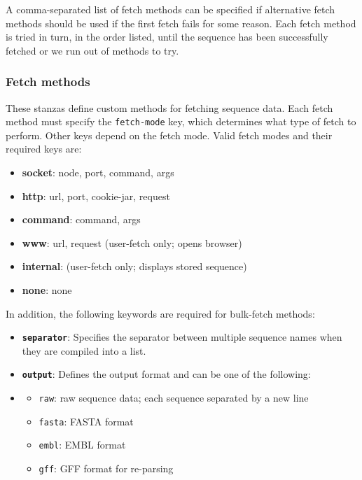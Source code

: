 \documentclass[letterpaper]{article}
\newcommand\textstyleSourceText[1]{\texttt{#1}}
\newcommand\liststyleLii{%
\renewcommand\labelitemi{{\textbullet}}
\renewcommand\labelitemii{{\textbullet}}
\renewcommand\labelitemiii{{\textbullet}}
\renewcommand\labelitemiv{{\textbullet}}
}
\newcommand\liststyleLiii{%
\renewcommand\labelitemi{{\textbullet}}
\renewcommand\labelitemii{{\textbullet}}
\renewcommand\labelitemiii{{\textbullet}}
\renewcommand\labelitemiv{{\textbullet}}
}
\begin{document}
{A comma-separated list of fetch methods can be specified if alternative
fetch methods should be used if the first fetch fails for some reason.
Each fetch method is tried in turn, in the order listed, until the
sequence has been successfully fetched or we run out of methods to try.}

{\color[rgb]{0.30980393,0.5058824,0.7411765}\subsubsection[Fetch methods ]{Fetch methods }}
{These stanzas define custom methods for fetching sequence data. Each
fetch method must specify the \textstyleSourceText{fetch-mode} key,
which determines what type of fetch to perform. Other keys depend on
the fetch mode. Valid fetch modes and their required keys are: }

\liststyleLii
\begin{itemize}
\item {\ttfamily
\textbf{socket}: node, port, command, args }
\item {\ttfamily
\textbf{http}: url, port, cookie-jar, request }
\item {\ttfamily
\textbf{command}: command, args }
\item {\ttfamily
\textbf{www}: url, request (user-fetch only; opens browser) }
\item {\ttfamily
\textbf{internal}: (user-fetch only; displays stored sequence) }
\item {\ttfamily
\textbf{none}: none }
\end{itemize}

\bigskip

{
In addition, the following keywords are required for bulk-fetch methods:
}

\liststyleLii
\begin{itemize}
\item {
\texttt{\textbf{separator}}: Specifies the separator between multiple
sequence names when they are compiled into a list. }
\item {
\texttt{\textbf{output}}: Defines the output format and can be one of
the following: }
\end{itemize}
\liststyleLiii
\begin{itemize}
\item \begin{itemize}
\item {
\texttt{raw}: raw sequence data; each sequence separated by a new line}
\item {
\texttt{fasta}: FASTA format }
\item {
\texttt{embl}: EMBL format }
\item {
\texttt{gff}: GFF format for re-parsing }
\end{itemize}
\end{itemize}
\end{document}

